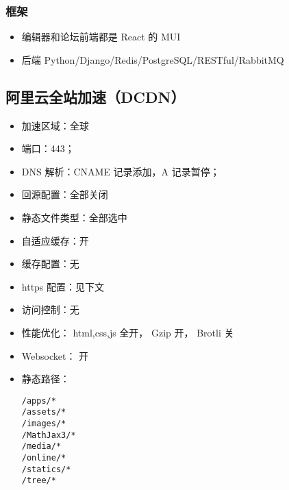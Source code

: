 \subsubsection{框架}
\begin{itemize}
\item 编辑器和论坛前端都是 React 的 MUI
\item 后端 Python/Django/Redis/PostgreSQL/RESTful/RabbitMQ
\end{itemize}

\subsection{阿里云全站加速（DCDN）}
\begin{itemize}
\item 加速区域：全球
\item 端口：443；
\item DNS 解析：CNAME 记录添加，A 记录暂停；
\item 回源配置：全部关闭
\item 静态文件类型：全部选中
\item 自适应缓存：开
\item 缓存配置：无
\item https 配置：见下文
\item 访问控制：无
\item 性能优化： html,css,js 全开， Gzip 开， Brotli 关
\item Websocket： 开
\item 静态路径：
\begin{lstlisting}[language=none]
/apps/*
/assets/*
/images/*
/MathJax3/*
/media/*
/online/*
/statics/*
/tree/*
\end{lstlisting}
\end{itemize}


